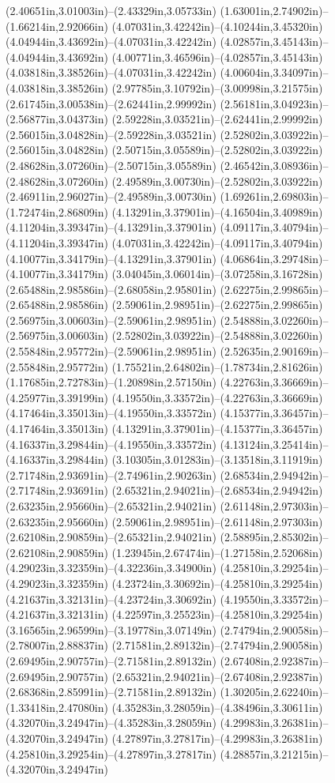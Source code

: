 (2.40651in,3.01003in)--(2.43329in,3.05733in) (1.63001in,2.74902in)--(1.66214in,2.92066in) (4.07031in,3.42242in)--(4.10244in,3.45320in) (4.04944in,3.43692in)--(4.07031in,3.42242in) (4.02857in,3.45143in)--(4.04944in,3.43692in) (4.00771in,3.46596in)--(4.02857in,3.45143in) (4.03818in,3.38526in)--(4.07031in,3.42242in) (4.00604in,3.34097in)--(4.03818in,3.38526in) (2.97785in,3.10792in)--(3.00998in,3.21575in) (2.61745in,3.00538in)--(2.62441in,2.99992in) (2.56181in,3.04923in)--(2.56877in,3.04373in) (2.59228in,3.03521in)--(2.62441in,2.99992in) (2.56015in,3.04828in)--(2.59228in,3.03521in) (2.52802in,3.03922in)--(2.56015in,3.04828in) (2.50715in,3.05589in)--(2.52802in,3.03922in) (2.48628in,3.07260in)--(2.50715in,3.05589in) (2.46542in,3.08936in)--(2.48628in,3.07260in) (2.49589in,3.00730in)--(2.52802in,3.03922in) (2.46911in,2.96027in)--(2.49589in,3.00730in) (1.69261in,2.69803in)--(1.72474in,2.86809in) (4.13291in,3.37901in)--(4.16504in,3.40989in) (4.11204in,3.39347in)--(4.13291in,3.37901in) (4.09117in,3.40794in)--(4.11204in,3.39347in) (4.07031in,3.42242in)--(4.09117in,3.40794in) (4.10077in,3.34179in)--(4.13291in,3.37901in) (4.06864in,3.29748in)--(4.10077in,3.34179in) (3.04045in,3.06014in)--(3.07258in,3.16728in) (2.65488in,2.98586in)--(2.68058in,2.95801in) (2.62275in,2.99865in)--(2.65488in,2.98586in) (2.59061in,2.98951in)--(2.62275in,2.99865in) (2.56975in,3.00603in)--(2.59061in,2.98951in) (2.54888in,3.02260in)--(2.56975in,3.00603in) (2.52802in,3.03922in)--(2.54888in,3.02260in) (2.55848in,2.95772in)--(2.59061in,2.98951in) (2.52635in,2.90169in)--(2.55848in,2.95772in) (1.75521in,2.64802in)--(1.78734in,2.81626in) (1.17685in,2.72783in)--(1.20898in,2.57150in) (4.22763in,3.36669in)--(4.25977in,3.39199in) (4.19550in,3.33572in)--(4.22763in,3.36669in) (4.17464in,3.35013in)--(4.19550in,3.33572in) (4.15377in,3.36457in)--(4.17464in,3.35013in) (4.13291in,3.37901in)--(4.15377in,3.36457in) (4.16337in,3.29844in)--(4.19550in,3.33572in) (4.13124in,3.25414in)--(4.16337in,3.29844in) (3.10305in,3.01283in)--(3.13518in,3.11919in) (2.71748in,2.93691in)--(2.74961in,2.90263in) (2.68534in,2.94942in)--(2.71748in,2.93691in) (2.65321in,2.94021in)--(2.68534in,2.94942in) (2.63235in,2.95660in)--(2.65321in,2.94021in) (2.61148in,2.97303in)--(2.63235in,2.95660in) (2.59061in,2.98951in)--(2.61148in,2.97303in) (2.62108in,2.90859in)--(2.65321in,2.94021in) (2.58895in,2.85302in)--(2.62108in,2.90859in) (1.23945in,2.67474in)--(1.27158in,2.52068in) (4.29023in,3.32359in)--(4.32236in,3.34900in) (4.25810in,3.29254in)--(4.29023in,3.32359in) (4.23724in,3.30692in)--(4.25810in,3.29254in) (4.21637in,3.32131in)--(4.23724in,3.30692in) (4.19550in,3.33572in)--(4.21637in,3.32131in) (4.22597in,3.25523in)--(4.25810in,3.29254in) (3.16565in,2.96599in)--(3.19778in,3.07149in) (2.74794in,2.90058in)--(2.78007in,2.88837in) (2.71581in,2.89132in)--(2.74794in,2.90058in) (2.69495in,2.90757in)--(2.71581in,2.89132in) (2.67408in,2.92387in)--(2.69495in,2.90757in) (2.65321in,2.94021in)--(2.67408in,2.92387in) (2.68368in,2.85991in)--(2.71581in,2.89132in) (1.30205in,2.62240in)--(1.33418in,2.47080in) (4.35283in,3.28059in)--(4.38496in,3.30611in) (4.32070in,3.24947in)--(4.35283in,3.28059in) (4.29983in,3.26381in)--(4.32070in,3.24947in) (4.27897in,3.27817in)--(4.29983in,3.26381in) (4.25810in,3.29254in)--(4.27897in,3.27817in) (4.28857in,3.21215in)--(4.32070in,3.24947in) 